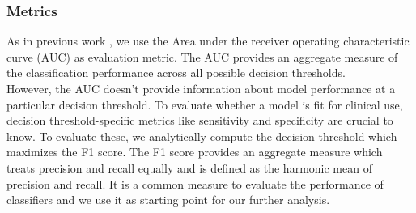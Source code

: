 \subsubsection{Metrics} \label{subsubsec:metrics}
As in previous work \cite{dsc} \cite{buschhertel}, we use the Area under the receiver operating characteristic curve (AUC) as evaluation metric. The AUC provides an aggregate measure of the classification performance across all possible decision thresholds.\\
However, the AUC doesn't provide information about model performance at a particular decision threshold. To evaluate whether a model is fit for clinical use, decision threshold-specific metrics like sensitivity and specificity are crucial to know.
To evaluate these, we analytically compute the decision threshold which maximizes the F1 score. The F1 score provides an aggregate measure which treats precision and recall equally and is defined as the harmonic mean of precision and recall. It is a common measure to evaluate the performance of classifiers and we use it as starting point for our further analysis. 


